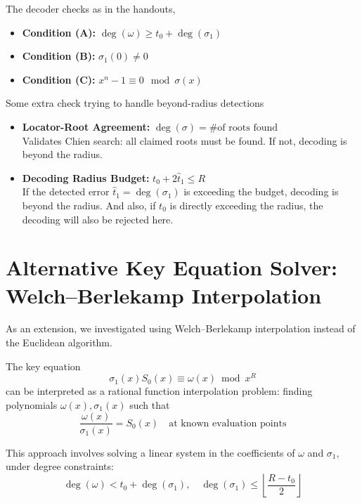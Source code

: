 \documentclass[11pt]{article}
\begin{document}
The decoder checks as in the handouts, 
\begin{itemize}
	\item \textbf{Condition (A):} \quad $\deg(\omega) \geq t_0 + \deg(\sigma_1)$ 
    \item \textbf{Condition (B):} \quad $\sigma_1(0) \neq 0$ 
    \item \textbf{Condition (C):} \quad $x^n - 1 \equiv 0 \mod \sigma(x)$ 
\end{itemize}
Some extra check trying to handle beyond-radius detections
\begin{itemize}
    \item \textbf{Locator-Root Agreement:} \quad $\deg(\sigma) = \text{\# of roots found}$ \\
    Validates Chien search: all claimed roots must be found. If not, decoding is beyond the radius.

    \item \textbf{Decoding Radius Budget:} \quad $t_0 + 2\hat{t}_1 \leq R$ \\
    If the detected error $\hat{t}_1=\deg(\sigma_1)$ is exceeding the budget, decoding is beyond the radius. 
	And also, if $t_0$ is directly exceeding the radius, the decoding will also be rejected here.

\end{itemize}

\section{Alternative Key Equation Solver: Welch--Berlekamp Interpolation}
As an extension, we investigated using Welch--Berlekamp interpolation instead of the Euclidean algorithm.

The key equation
\[
\sigma_1(x) S_0(x) \equiv \omega(x) \bmod x^R
\]
can be interpreted as a rational function interpolation problem: finding polynomials \( \omega(x), \sigma_1(x) \) such that
\[
\frac{\omega(x)}{\sigma_1(x)} = S_0(x) \quad \text{at known evaluation points}
\]

This approach involves solving a linear system in the coefficients of \( \omega \) and \( \sigma_1 \), under degree constraints:
\[
\deg(\omega) < t_0 + \deg(\sigma_1), \quad \deg(\sigma_1) \leq \left\lfloor \frac{R - t_0}{2} \right\rfloor
\]
\end{document}
